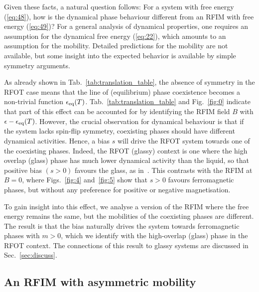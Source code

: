 \documentclass{iopart}
\newcommand{\eqref}[1]{(\ref{#1})}
\begin{document}
Given these facts, a natural question follows: For a system with free energy \eqref{eq:48}, how is the dynamical phase behaviour different from an RFIM with free energy \eqref{eq:49}?  For a general analysis of dynamical properties, one requires an assumption for the dynamical free energy \eqref{eq:22}, which amounts to an assumption for the mobility.  Detailed predictions for the mobility are not available, but some insight into the expected behavior is available by simple symmetry arguments.

As already shown in Tab.~\ref{tab:translation_table}, the absence of symmetry in the RFOT case means that the line of (equilibrium) phase coexistence becomes a non-trivial function $\epsilon_{\rm eq}(T)$.  Tab.~\ref{tab:translation_table} and Fig.~\ref{fig:0} indicate that part of this effect can be accounted for by identifying the RFIM field $B$ with $\epsilon - \epsilon_{\rm eq}(T)$. However, 
the crucial observation for dynamical behaviour is that if the system lacks spin-flip symmetry, coexisting phases should have different dynamical activities.  Hence, a bias $s$ will drive the RFOT system towards one of the coexisting phases.  
Indeed, the RFOT (glassy) context is one where the high overlap (glass) phase has much lower dynamical activity than the liquid, so that positive bias $(s>0)$ favours the glass, as in~\cite{hedges2009dynamic}. This contrasts with the RFIM at $B=0$, where Figs.~\ref{fig:4} and~\ref{fig:5} show that $s>0$ favours ferromagnetic phases, but without any preference for positive or negative magnetisation.

To gain insight into this effect, we 
analyse a version of the RFIM where the free energy remains the same, but the mobilities of the coexisting phases are different.  The result is that the bias naturally drives the system towards ferromagnetic phases with $m>0$, which we identify with the high-overlap (glass) phase in the RFOT context.  The connections of this result to glassy systems are discussed in Sec.~\ref{sec:discuss}.

\subsection{An RFIM with asymmetric mobility}
\end{document}
